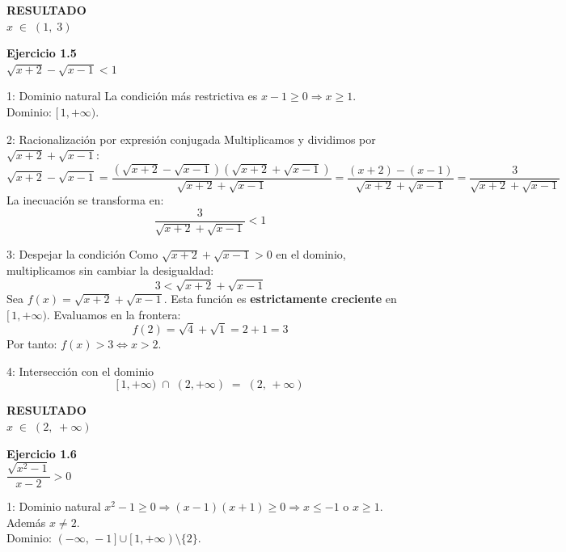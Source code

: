 \documentclass[letterpaper, 11pt]{article}
\newcommand{\exheader}[2]{%
    \begin{tcolorbox}[colback=azulFuerte!12, colframe=azulFuerte,
        arc=8pt, boxrule=1.5pt, enhanced]
        {\large\textbf{\color{azulFuerte}Ejercicio #1}} \\[0.4em]
        \centering\LARGE $\displaystyle #2$
    \end{tcolorbox}
    \smallskip}
\newcommand{\resultado}[1]{%
    \begin{tcolorbox}[colback=azulFuerte, colframe=azulFuerte, colupper=white,
        arc=8pt, boxrule=1.5pt, enhanced, drop shadow={black!12}]
        \centering\large\textbf{RESULTADO} \\[0.4em]
        \LARGE $\displaystyle #1$
    \end{tcolorbox}}
\begin{document}
\resultado{x \;\in\; (1,\;3)}

\clearpage

\exheader{1.5}{\sqrt{x+2} - \sqrt{x-1} < 1}

\begin{paso}{1: Dominio natural}
La condición más restrictiva es $x - 1 \geq 0 \Rightarrow x \geq 1$.\\
Dominio: $[\,1,+\infty)$.
\end{paso}

\begin{paso}{2: Racionalización por expresión conjugada}
Multiplicamos y dividimos por $\sqrt{x+2}+\sqrt{x-1}$:
\[
    \sqrt{x+2} - \sqrt{x-1}
    = \frac{(\sqrt{x+2}-\sqrt{x-1})(\sqrt{x+2}+\sqrt{x-1})}{\sqrt{x+2}+\sqrt{x-1}}
    = \frac{(x+2)-(x-1)}{\sqrt{x+2}+\sqrt{x-1}}
    = \frac{3}{\sqrt{x+2}+\sqrt{x-1}}
\]
La inecuación se transforma en:
\[
    \frac{3}{\sqrt{x+2}+\sqrt{x-1}} < 1
\]
\end{paso}

\begin{paso}{3: Despejar la condición}
Como $\sqrt{x+2}+\sqrt{x-1} > 0$ en el dominio, multiplicamos sin cambiar la desigualdad:
\[
    3 < \sqrt{x+2} + \sqrt{x-1}
\]
Sea $f(x) = \sqrt{x+2} + \sqrt{x-1}$. Esta función es \textbf{estrictamente creciente} en
$[\,1,+\infty)$. Evaluamos en la frontera:
\[
    f(2) = \sqrt{4} + \sqrt{1} = 2 + 1 = 3
\]
Por tanto: $f(x) > 3 \Leftrightarrow x > 2$.
\end{paso}

\begin{paso}{4: Intersección con el dominio}
\[
    [\,1,+\infty) \;\cap\; (2,+\infty) \;=\; (2,\,+\infty)
\]
\end{paso}

\resultado{x \;\in\; (2,\;+\infty)}

\clearpage

\exheader{1.6}{\dfrac{\sqrt{x^2 - 1}}{x - 2} > 0}

\begin{paso}{1: Dominio natural}
$x^2 - 1 \geq 0 \Rightarrow (x-1)(x+1) \geq 0 \Rightarrow x \leq -1$ o $x \geq 1$.
Además $x \neq 2$.\\
Dominio: $(-\infty,\,-1\,]\cup[\,1,+\infty)\setminus\{2\}$.
\end{paso}
\end{document}
